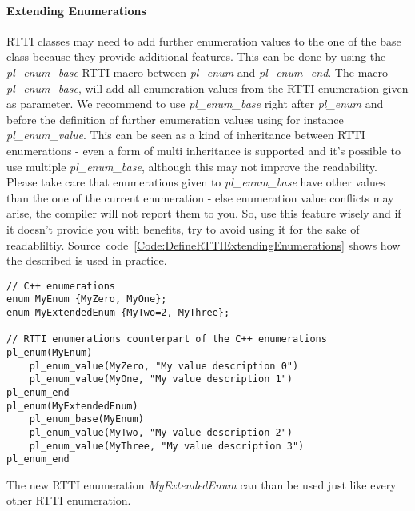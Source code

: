 \paragraph{Extending Enumerations}
RTTI classes may need to add further enumeration values to the one of the base class because they provide additional features. This can be done by using the \emph{pl\_enum\_base} RTTI macro between \emph{pl\_enum} and \emph{pl\_enum\_end}. The macro \emph{pl\_enum\_base}, will add all enumeration values from the RTTI enumeration given as parameter. We recommend to use \emph{pl\_enum\_base} right after \emph{pl\_enum} and before the definition of further enumeration values using for instance \emph{pl\_enum\_value}. This can be seen as a kind of inheritance between RTTI enumerations - even a form of multi inheritance is supported and it's possible to use multiple \emph{pl\_enum\_base}, although this may not improve the readability. Please take care that enumerations given to \emph{pl\_enum\_base} have other values than the one of the current enumeration - else enumeration value conflicts may arise, the compiler will not report them to you. So, use this feature wisely and if it doesn't provide you with benefits, try to avoid using it for the sake of readabliltiy. Source~code~\ref{Code:DefineRTTIExtendingEnumerations} shows how the described is used in practice.
\begin{lstlisting}[label=Code:DefineRTTIExtendingEnumerations,caption={Defining an extended RTTI enumeration}]
// C++ enumerations
enum MyEnum {MyZero, MyOne};
enum MyExtendedEnum {MyTwo=2, MyThree};

// RTTI enumerations counterpart of the C++ enumerations
pl_enum(MyEnum)
	pl_enum_value(MyZero, "My value description 0")
	pl_enum_value(MyOne, "My value description 1")
pl_enum_end
pl_enum(MyExtendedEnum)
	pl_enum_base(MyEnum)
	pl_enum_value(MyTwo, "My value description 2")
	pl_enum_value(MyThree, "My value description 3")
pl_enum_end
\end{lstlisting}
The new RTTI enumeration \emph{MyExtendedEnum} can than be used just like every other RTTI enumeration.


